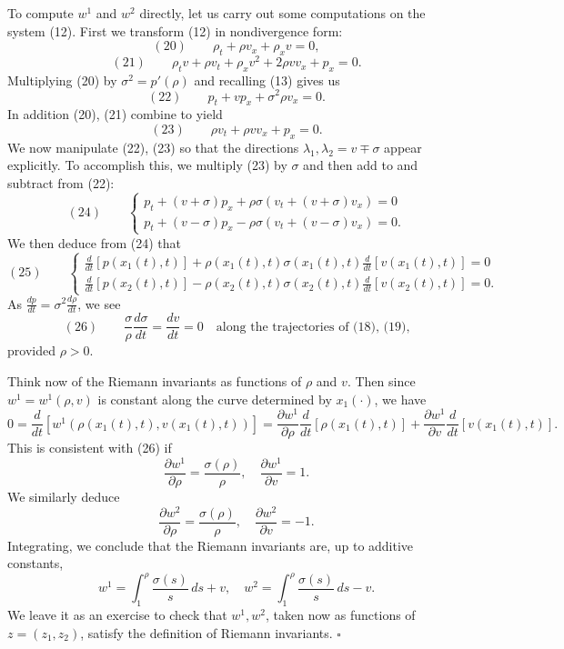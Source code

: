 \begin{example}
To compute $w^1$ and $w^2$ directly, let us carry out some computations on the system (12). First we transform (12) in nondivergence form:
$$(20) \qquad \rho_t + \rho v_x + \rho_x v = 0,$$
$$(21) \qquad \rho_t v + \rho v_t + \rho_x v^2 + 2\rho v v_x + p_x = 0.$$
Multiplying (20) by $\sigma^2 = p'(\rho)$ and recalling (13) gives us
$$(22) \qquad p_t + vp_x + \sigma^2\rho v_x = 0.$$
In addition (20), (21) combine to yield
$$(23) \qquad \rho v_t + \rho v v_x + p_x = 0.$$
We now manipulate (22), (23) so that the directions $\lambda_1,\lambda_2 = v\mp\sigma$ appear explicitly. To accomplish this, we multiply (23) by $\sigma$ and then add to and subtract from (22):
$$(24) \qquad \begin{cases} p_t + (v+\sigma)p_x + \rho\sigma(v_t+(v+\sigma)v_x) = 0 \\ p_t + (v-\sigma)p_x - \rho\sigma(v_t+(v-\sigma)v_x) = 0. \end{cases}$$
We then deduce from (24) that
$$(25) \qquad \begin{cases} \frac{d}{dt}[p(x_1(t),t)] + \rho(x_1(t),t)\sigma(x_1(t),t)\frac{d}{dt}[v(x_1(t),t)] = 0 \\ \frac{d}{dt}[p(x_2(t),t)] - \rho(x_2(t),t)\sigma(x_2(t),t)\frac{d}{dt}[v(x_2(t),t)] = 0. \end{cases}$$
As $\frac{dp}{dt} = \sigma^2\frac{d\rho}{dt}$, we see
$$(26) \qquad \frac{\sigma}{\rho}\frac{d\sigma}{dt} = \frac{dv}{dt} = 0 \quad \text{along the trajectories of (18), (19),}$$
provided $\rho>0$.

Think now of the Riemann invariants as functions of $\rho$ and $v$. Then since $w^1=w^1(\rho,v)$ is constant along the curve determined by $x_1(\cdot)$, we have
$$0 = \frac{d}{dt}[w^1(\rho(x_1(t),t),v(x_1(t),t))] = \frac{\partial w^1}{\partial\rho}\frac{d}{dt}[\rho(x_1(t),t)] + \frac{\partial w^1}{\partial v}\frac{d}{dt}[v(x_1(t),t)].$$
This is consistent with (26) if
$$\frac{\partial w^1}{\partial\rho} = \frac{\sigma(\rho)}{\rho}, \quad \frac{\partial w^1}{\partial v} = 1.$$
We similarly deduce
$$\frac{\partial w^2}{\partial\rho} = \frac{\sigma(\rho)}{\rho}, \quad \frac{\partial w^2}{\partial v} = -1.$$
Integrating, we conclude that the Riemann invariants are, up to additive constants,
$$w^1 = \int_1^\rho \frac{\sigma(s)}{s}\,ds + v, \quad w^2 = \int_1^\rho \frac{\sigma(s)}{s}\,ds - v.$$
We leave it as an exercise to check that $w^1, w^2$, taken now as functions of $z=(z_1,z_2)$, satisfy the definition of Riemann invariants. $\square$
\end{example}


